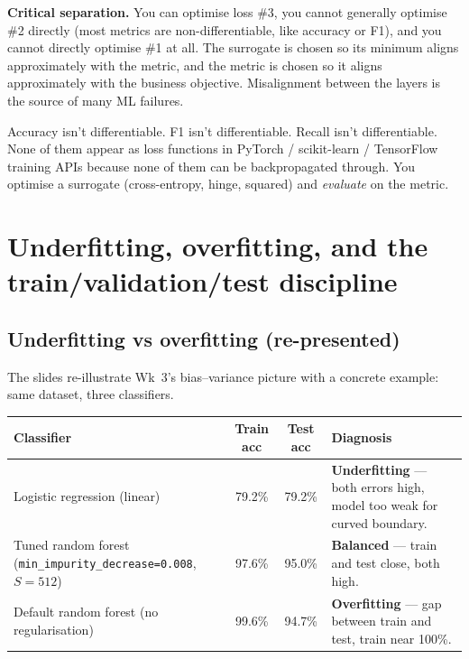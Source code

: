 \documentclass[11pt, a4paper]{article}
\newcommand{\thead}[1]{\textbf{#1}}
\begin{document}
\textbf{Critical separation.} You can optimise loss \#3, you cannot generally optimise \#2 directly (most metrics are non-differentiable, like accuracy or F1), and you cannot directly optimise \#1 at all. The surrogate is chosen so its minimum aligns approximately with the metric, and the metric is chosen so it aligns approximately with the business objective. Misalignment between the layers is the source of many ML failures.

\begin{pitfallbox}
Accuracy isn't differentiable. F1 isn't differentiable. Recall isn't differentiable. None of them appear as loss functions in PyTorch / scikit-learn / TensorFlow training APIs because none of them can be backpropagated through. You optimise a surrogate (cross-entropy, hinge, squared) and \emph{evaluate} on the metric.
\end{pitfallbox}

\section{Underfitting, overfitting, and the train/validation/test discipline}

\subsection{Underfitting vs overfitting (re-presented)}

The slides re-illustrate Wk~3's bias--variance picture with a concrete example: same dataset, three classifiers.

\begin{center}
\renewcommand{\arraystretch}{1.2}
\begin{tabularx}{\linewidth}{l c c X}
\toprule
\thead{Classifier} & \thead{Train acc} & \thead{Test acc} & \thead{Diagnosis} \\
\midrule
Logistic regression (linear) & 79.2\% & 79.2\% & \textbf{Underfitting} — both errors high, model too weak for curved boundary. \\
Tuned random forest (\texttt{min\_impurity\_decrease=0.008}, $S=512$) & 97.6\% & 95.0\% & \textbf{Balanced} — train and test close, both high. \\
Default random forest (no regularisation) & 99.6\% & 94.7\% & \textbf{Overfitting} — gap between train and test, train near 100\%. \\
\bottomrule
\end{tabularx}
\end{center}
\end{document}
